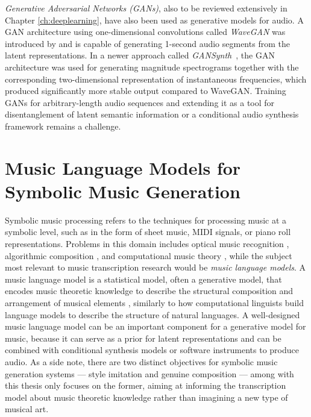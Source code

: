 \textit{Generative Adversarial Networks (GANs)}, also to be reviewed extensively in Chapter \ref{ch:deeplearning}, have also been used as generative models for audio.
A GAN architecture using one-dimensional convolutions called \emph{WaveGAN} was introduced by  and is capable of generating 1-second audio segments from the latent representations.
In a newer approach called \emph{GANSynth}~\cite{engel2019gansynth}, the GAN architecture was used for generating magnitude spectrograms together with the corresponding two-dimensional representation of instantaneous frequencies, which produced significantly more stable output compared to WaveGAN.
Training GANs for arbitrary-length audio sequences and extending it as a tool for disentanglement of latent semantic information or a conditional audio synthesis framework remains a challenge.

\section{Music Language Models for Symbolic Music Generation}

Symbolic music processing refers to the techniques for processing music at a symbolic level, such as in the form of sheet music, MIDI signals, or piano roll representations.
Problems in this domain includes optical music recognition \cite{rebelo2012omr}, algorithmic composition \cite{fernandez2013ai}, and computational music theory \cite{hamanaka2013computational}, while the subject most relevant to music transcription research would be \emph{music language models}.
A music language model is a statistical model, often a generative model, that encodes music theoretic knowledge to describe the structural composition and arrangement of musical elements \cite{patel2010musiclanguage}, similarly to how computational linguists build language models to describe the structure of natural languages.
A well-designed music language model can be an important component for a generative model for music, because it can serve as a prior for latent representations and can be combined with conditional synthesis models or software instruments to produce audio.
As a side note, there are two distinct objectives for symbolic music generation systems --- style imitation and genuine composition \cite{nierhaus2009composition} --- among with this thesis only focuses on the former, aiming at informing the transcription model about music theoretic knowledge rather than imagining a new type of musical art.

